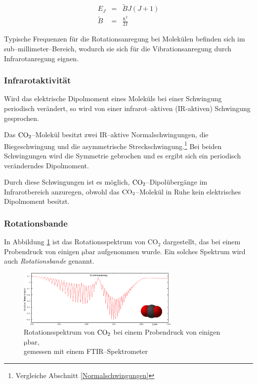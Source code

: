 \documentclass[12pt,a4paper]{scrartcl}
\numberwithin{equation}{section} %
\begin{document}
\begin{eqnarray}
	E_J &=& \tilde{B} J (J + 1) \\
	\tilde{B} &=& \frac{\hbar^2}{2 I}
\end{eqnarray}

\noindent
Typische Frequenzen für die Rotationsanregung bei Molekülen befinden sich im sub--millimeter--Bereich, wodurch sie sich für die Vibrationsanregung durch Infrarotanregung eignen.

\hypertarget{infrarotaktivituxe4t}{\subsubsection{Infrarotaktivität}\label{infrarotaktivituxe4t}}
Wird das elektrische Dipolmoment eines Moleküls bei einer Schwingung periodisch verändert, so wird von einer infrarot--aktiven (IR-aktiven) Schwingung gesprochen.

Das $\ce{CO_2}$--Molekül besitzt zwei  IR--aktive Normalschwingungen, die Biegeschwingung und die asymmetrische Streckschwingung.\footnote{Vergleiche Abschnitt \ref{Normalschwingungen}} Bei beiden Schwingungen wird die Symmetrie gebrochen und es ergibt sich ein periodisch veränderndes Dipolmoment.

Durch diese Schwingungen ist es möglich, $\ce{CO_2}$--Dipolübergänge im Infrarotbereich anzuregen, obwohl das $\ce{CO_2}$--Molekül  in Ruhe kein elektrisches Dipolmoment besitzt. \cite{HakenWolf} %

\hypertarget{Rotationsbande}{\subsubsection{Rotationsbande}\label{Rotationsbande}}
In Abbildung \ref{fig:rotationsspektrumCO2} ist das Rotationsspektrum von CO$_2$ dargestellt, das bei einem Probendruck von einigen $\mathrm{\mu bar}$ aufgenommen wurde. Ein solches Spektrum wird auch \emph{Rotationsbande} genannt.

\begin{figure}[h]
	\centering
	\includegraphics[width=0.7\textwidth]{../media/B1.1/Rotationssprektrum_CO2.png}
	\caption{Rotationsspektrum von $\ce{CO_2}$ bei einem Probendruck von einigen $\mathrm{\mu bar}$,\\
		gemessen mit einem FTIR--Spektrometer \cite{UzK}}
	\label{fig:rotationsspektrumCO2}
\end{figure}
\end{document}
